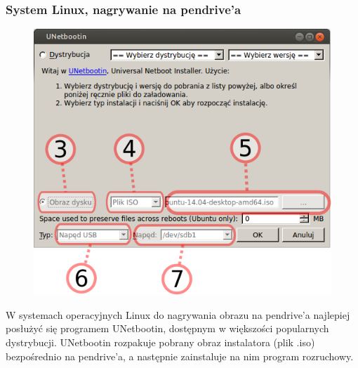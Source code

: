 \subsubsection{System Linux, nagrywanie na pendrive'a}
\begin{figure}
	\vspace{-10pt}
	\includegraphics[width=\linewidth]{images/instalacja_nagrywanie_obrazu_linux.png}
\end{figure}

W systemach operacyjnych Linux do nagrywania obrazu na pendrive'a najlepiej posłużyć się programem \textcolor{ubuntu_orange}{UNetbootin}, dostępnym w większości popularnych dystrybucji. UNetbootin rozpakuje pobrany obraz instalatora (plik .iso) bezpośrednio na pendrive'a, a następnie zainstaluje na nim program rozruchowy.

